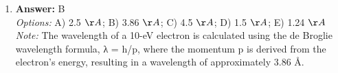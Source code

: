 \documentclass[12pt]{article}
\begin{document}
\begin{enumerate}[label=\arabic*.]
\\ \textit{Note:} The electric displacement current is defined by Maxwell's equations as being proportional to the rate of change of electric flux through a surface, which accounts for changing electric fields in situations where there is no actual current flow.
\item \textbf{Answer:} B
\\ \textit{Options:} A) 2.5 \ensuremath{\AA}; B) 3.86 \ensuremath{\AA}; C) 4.5 \ensuremath{\AA}; D) 1.5 \ensuremath{\AA}; E) 1.24 \ensuremath{\AA}
\\ \textit{Note:} The wavelength of a 10-eV electron is calculated using the de Broglie wavelength formula, λ = h/p, where the momentum p is derived from the electron's energy, resulting in a wavelength of approximately 3.86 Å.
\end{enumerate}
\end{document}
